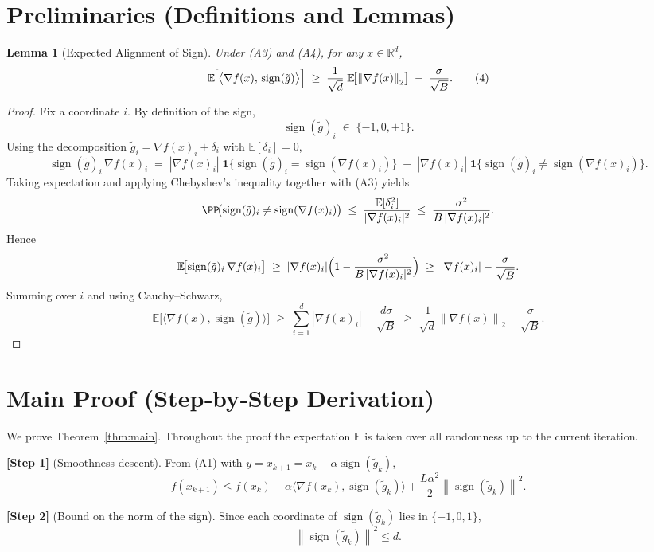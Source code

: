 \documentclass{article}
\newtheorem{lemma}{Lemma}
\newcommand{\sign}{\operatorname{sign}}
\newcommand{\EE}{\mathbb{E}}
\newcommand{\RR}{\mathbb{R}}
\newcommand{\norm}[1]{\left\lVert#1\right\rVert}
\begin{document}
\section*{Preliminaries (Definitions and Lemmas)}
\begin{lemma}[Expected Alignment of Sign]\label{lem:sign-align}
Under (A3) and (A4), for any $x\in\RR^{d}$,
\[
\EE\!\Bigl[\big\langle \nabla f(x),\,\sign(\tilde g)\big\rangle\Bigr]
\;\ge\;
\frac{1}{\sqrt{d}}\;\EE\!\bigl[\norm{\nabla f(x)}_{2}\bigr]
\;-\;
\frac{\sigma}{\sqrt{B}} .
\tag{4}
\]
\end{lemma}
\begin{proof}
Fix a coordinate $i$.  By definition of the sign,
\[
\sign(\tilde g)_{i}\;\in\;\{-1,0,+1\}.
\]
Using the decomposition $\tilde g_{i}= \nabla f(x)_{i}+ \delta_{i}$ with $\EE[\delta_{i}]=0$,
\[
\sign(\tilde g)_{i}\,\nabla f(x)_{i}
\;=\;
|\nabla f(x)_{i}|\;\mathbf{1}\!\bigl\{\sign(\tilde g)_{i}=\sign(\nabla f(x)_{i})\bigr\}
\;-\;
|\nabla f(x)_{i}|\;\mathbf{1}\!\bigl\{\sign(\tilde g)_{i}\neq\sign(\nabla f(x)_{i})\bigr\}.
\]
Taking expectation and applying Chebyshev’s inequality together with (A3) yields
\[
\PP\!\bigl(\sign(\tilde g)_{i}\neq\sign(\nabla f(x)_{i})\bigr)
\;\le\;
\frac{\EE[\delta_{i}^{2}]}{|\nabla f(x)_{i}|^{2}}
\;\le\;
\frac{\sigma^{2}}{B\,|\nabla f(x)_{i}|^{2}} .
\]
Hence
\[
\EE\!\bigl[\sign(\tilde g)_{i}\,\nabla f(x)_{i}\bigr]
\;\ge\;
|\nabla f(x)_{i}|\Bigl(1-\frac{\sigma^{2}}{B\,|\nabla f(x)_{i}|^{2}}\Bigr)
\;\ge\;
|\nabla f(x)_{i}|-\frac{\sigma}{\sqrt{B}} .
\]
Summing over $i$ and using Cauchy–Schwarz,
\[
\EE\!\bigl[\langle \nabla f(x),\sign(\tilde g)\rangle\bigr]
\;\ge\;
\sum_{i=1}^{d}|\nabla f(x)_{i}|-\frac{d\sigma}{\sqrt{B}}
\;\ge\;
\frac{1}{\sqrt{d}}\norm{\nabla f(x)}_{2}-\frac{\sigma}{\sqrt{B}} .
\tag{5}
\]
\end{proof}

\section*{Main Proof (Step‑by‑Step Derivation)}
We prove Theorem~\ref{thm:main}.  Throughout the proof the expectation $\EE$ is taken over all randomness up to the current iteration.

\noindent\textbf{[Step 1]} (Smoothness descent).  
From (A1) with $y=x_{k+1}=x_{k}-\alpha\sign(\tilde g_{k})$,
\[
f(x_{k+1})\le f(x_{k})-\alpha\langle \nabla f(x_{k}),\sign(\tilde g_{k})\rangle
+\frac{L\alpha^{2}}{2}\norm{\sign(\tilde g_{k})}^{2}.
\tag{6}
\]

\noindent\textbf{[Step 2]} (Bound on the norm of the sign).  
Since each coordinate of $\sign(\tilde g_{k})$ lies in $\{-1,0,1\}$,
\[
\norm{\sign(\tilde g_{k})}^{2}\le d.
\tag{7}
\]
\end{document}
